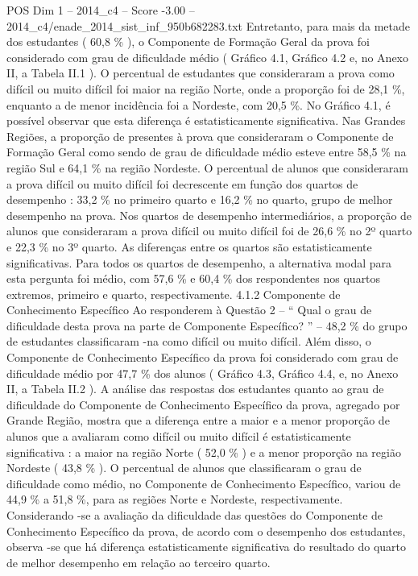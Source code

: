 \begin{textsample}{POS Dim 1 – 2014\_c4 – Score -3.00 – 2014\_c4/enade\_2014\_sist\_inf\_950b682283.txt}
Entretanto, para mais da metade dos estudantes ( 60,8 \% ), o Componente de Formação Geral da prova foi considerado com grau de dificuldade médio ( Gráfico 4.1, Gráfico 4.2 e, no Anexo II, a Tabela II.1 ).
O percentual de estudantes que consideraram a prova como difícil ou muito difícil foi maior na região Norte, onde a proporção foi de 28,1 \%, enquanto a de menor incidência foi a Nordeste, com 20,5 \%.
No Gráfico 4.1, é possível observar que esta diferença é estatisticamente significativa.
Nas Grandes Regiões, a proporção de presentes à prova que consideraram o Componente de Formação Geral como sendo de grau de dificuldade médio esteve entre 58,5 \% na região Sul e 64,1 \% na região Nordeste.
O percentual de alunos que consideraram a prova difícil ou muito difícil foi decrescente em função dos quartos de desempenho : 33,2 \% no primeiro quarto e 16,2 \% no quarto, grupo de melhor desempenho na prova.
Nos quartos de desempenho intermediários, a proporção de alunos que consideraram a prova difícil ou muito difícil foi de 26,6 \% no 2º quarto e 22,3 \% no 3º quarto.
As diferenças entre os quartos são estatisticamente significativas.
Para todos os quartos de desempenho, a alternativa modal para esta pergunta foi médio, com 57,6 \% e 60,4 \% dos respondentes nos quartos extremos, primeiro e quarto, respectivamente. 4.1.2 Componente de Conhecimento Específico Ao responderem à Questão 2 – “ Qual o grau de dificuldade desta prova na parte de Componente Específico? ” – 48,2 \% do grupo de estudantes classificaram -na como difícil ou muito difícil.
Além disso, o Componente de Conhecimento Específico da prova foi considerado com grau de dificuldade médio por 47,7 \% dos alunos ( Gráfico 4.3, Gráfico 4.4, e, no Anexo II, a Tabela II.2 ).
A análise das respostas dos estudantes quanto ao grau de dificuldade do Componente de Conhecimento Específico da prova, agregado por Grande Região, mostra que a diferença entre a maior e a menor proporção de alunos que a avaliaram como difícil ou muito difícil é estatisticamente significativa : a maior na região Norte ( 52,0 \% ) e a menor proporção na região Nordeste ( 43,8 \% ).
O percentual de alunos que classificaram o grau de dificuldade como médio, no Componente de Conhecimento Específico, variou de 44,9 \% a 51,8 \%, para as regiões Norte e Nordeste, respectivamente.
Considerando -se a avaliação da dificuldade das questões do Componente de Conhecimento Específico da prova, de acordo com o desempenho dos estudantes, observa -se que há diferença estatisticamente significativa do resultado do quarto de melhor desempenho em relação ao terceiro quarto.

\end{textsample}
